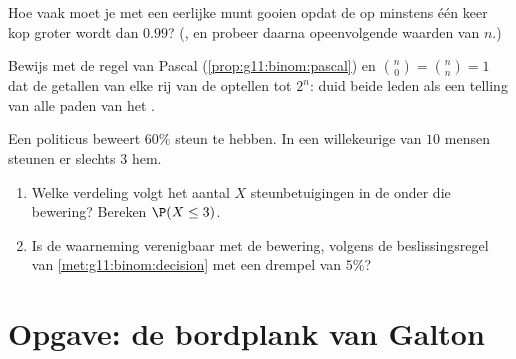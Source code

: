 \begin{exercise}[$\star\star$]\label{exo:g11:binom:9}
Hoe vaak moet je met een eerlijke munt gooien opdat de  op minstens één
keer kop groter wordt dan $0.99$? (, en probeer daarna
opeenvolgende waarden van $n$.)
\end{exercise}

\begin{exercise}[$\star\star$]\label{exo:g11:binom:10}
Bewijs met de regel van Pascal (\cref{prop:g11:binom:pascal}) en
$\binom n0 = \binom nn = 1$ dat de getallen van elke rij van de  optellen tot $2^n$: duid beide leden als een telling van alle paden
van het .
\end{exercise}

\begin{exercise}[$\star\star\star$]\label{exo:g11:binom:11}
Een politicus beweert $60\%$ steun te hebben. In een willekeurige 
van $10$ mensen steunen er slechts $3$ hem.
\begin{enumerate}
  \item Welke verdeling volgt het aantal $X$ steunbetuigingen in de
         onder die bewering? Bereken $\P(X \leq 3)$.
  \item Is de waarneming verenigbaar met de bewering, volgens de
        beslissingsregel van \cref{met:g11:binom:decision} met een drempel van
        $5\%$?
\end{enumerate}
\end{exercise}

\section{Opgave: de bordplank van Galton}

